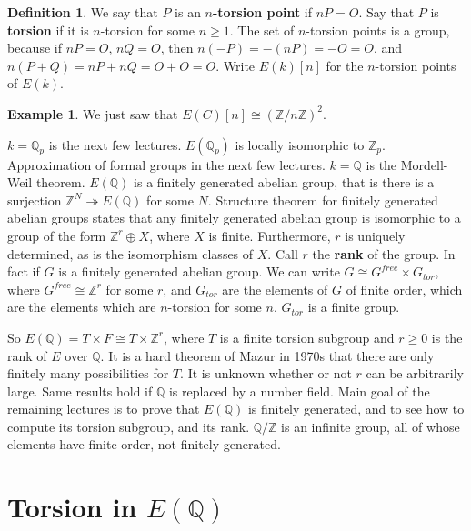 \documentclass{article}
\newcommand{\Z}{\mathbb{Z}}
\newcommand{\Q}{\mathbb{Q}}
\newcommand{\rb}[1]{\left( #1 \right)}
\renewcommand{\sb}[1]{\left[ #1 \right]}
\theoremstyle{definition}\newtheorem{definition}{Definition}[section]
\theoremstyle{definition}\newtheorem{remark}[definition]{Remark}
\theoremstyle{definition}\newtheorem*{example}{Example}
\theoremstyle{definition}\newtheorem*{note}{Note}
\begin{document}
\begin{definition}
We say that $ P $ is an \textbf{$ n $-torsion point} if $ nP = O $. Say that $ P $ is \textbf{torsion} if it is $ n $-torsion for some $ n \ge 1 $. The set of $ n $-torsion points is a group, because if $ nP = O $, $ nQ = O $, then $ n\rb{-P} = -\rb{nP} = -O = O $, and $ n\rb{P + Q} = nP + nQ = O + O = O $. Write $ E\rb{k}\sb{n} $ for the $ n $-torsion points of $ E\rb{k} $.
\end{definition}

\begin{example}
We just saw that $ E\rb{C}\sb{n} \cong \rb{\Z / n\Z}^2 $.
\end{example}

$ k = \Q_p $ is the next few lectures. $ E\rb{\Q_p} $ is locally isomorphic to $ \Z_p $. Approximation of formal groups in the next few lectures. $ k = \Q $ is the Mordell-Weil theorem. $ E\rb{\Q} $ is a finitely generated abelian group, that is there is a surjection $ \Z^N \twoheadrightarrow E\rb{\Q} $ for some $ N $. Structure theorem for finitely generated abelian groups states that any finitely generated abelian group is isomorphic to a group of the form $ \Z^r \oplus X $, where $ X $ is finite. Furthermore, $ r $ is uniquely determined, as is the isomorphism classes of $ X $. Call $ r $ the \textbf{rank} of the group. In fact if $ G $ is a finitely generated abelian group. We can write $ G \cong G^{free} \times G_{tor} $, where $ G^{free} \cong \Z^r $ for some $ r $, and $ G_{tor} $ are the elements of $ G $ of finite order, which are the elements which are $ n $-torsion for some $ n $. $ G_{tor} $ is a finite group.


So $ E\rb{\Q} = T \times F \cong T \times \Z^r $, where $ T $ is a finite torsion subgroup and $ r \ge 0 $ is the rank of $ E $ over $ \Q $. It is a hard theorem of Mazur in 1970s that there are only finitely many possibilities for $ T $. It is unknown whether or not $ r $ can be arbitrarily large. Same results hold if $ \Q $ is replaced by a number field. Main goal of the remaining lectures is to prove that $ E\rb{\Q} $ is finitely generated, and to see how to compute its torsion subgroup, and its rank. $ \Q / \Z $ is an infinite group, all of whose elements have finite order, not finitely generated.

\section{Torsion in $ E\rb{\Q} $}
\end{document}
